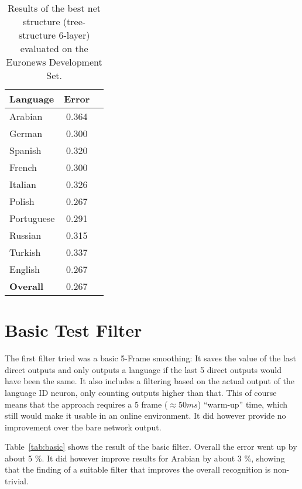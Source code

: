 \begin{table}[h!]
\label{tab:bareResults}
\centering
\begin{tabular}{| l | c | r | }
	\hline
	\textbf{Language} & \textbf{Error}  \\
	\hline
	Arabian & 0.364  \\
	German & 0.300  \\
	Spanish & 0.320 \\ 
	French & 0.300 \\
	Italian & 0.326  \\
	Polish & 0.267 \\
	Portuguese& 0.291  \\
	Russian&  0.315 \\
	Turkish&  0.337 \\
	English&  0.267 \\
	\hline
	\textbf{Overall} & 0.267 \\
	\hline
\end{tabular}
\caption{Results of the best net structure (tree-structure 6-layer) evaluated on the Euronews Development Set.}
\end{table}



\section{Basic Test Filter}
\label{sec:eval:basic}

The first filter tried was a basic 5-Frame smoothing: It saves the value of the last direct outputs and only outputs a language if the last 5 direct outputs would have been the same. It also includes a filtering based on the actual output of the language ID neuron, only counting outputs higher than that. This of course means that the approach requires a 5 frame (\(\approx 50 ms\)) ``warm-up'' time, which still would make it usable in an online environment. It did however provide no improvement over the bare network output.


Table~\ref{tab:basic} shows the result of the basic filter. Overall the error went up by about 5 \%. It did however improve results for Arabian by about 3 \%, showing that the finding of a suitable filter that improves the overall recognition is non-trivial.

